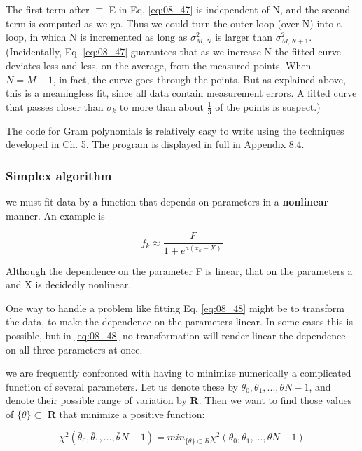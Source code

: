The first term after $\equiv$ E in Eq. \ref{eq:08_47} is independent of N, and the second term is computed as we go. Thus we could turn the outer loop (over N) into a  loop, in which N is incremented as long as $\sigma_{M,N}^{2}$ is larger than $\sigma_{M,N+1}^{2}$. (Incidentally, Eq. \ref{eq:08_47} guarantees that as we increase N the fitted curve deviates less and less, on the average, from the measured points. When $N = M-1$, in fact, the curve goes through the points. But as explained above, this is a meaningless fit, since all data contain measurement errors. A fitted curve that passes closer than $\sigma_{k}$ to more than about $\frac{1}{3}$ of the points is suspect.)

The code for Gram polynomials is relatively easy to write using the techniques developed in Ch. 5. The program is displayed in full in Appendix 8.4.

\subsubsection{Simplex algorithm}
 we must fit data by a function that depends on parameters in a \textbf{nonlinear} manner. An example is

\begin{equation}\label{eq:08_48}
f_{k} \approx \frac{F}{1+e^{a(x_{k}-X)}}
\end{equation}

Although the dependence on the parameter F is linear, that on the parameters a and X is decidedly nonlinear.

One way to handle a problem like fitting Eq. \ref{eq:08_48} might be to transform the data, to make the dependence on the parameters linear. In some cases this is possible, but in \ref{eq:08_48} no transformation will render linear the dependence on all three parameters at once.

 we are frequently confronted with having to minimize numerically a complicated function of several parameters. Let us denote these by $\theta_{0}, \theta_{1}, ... , \theta{N-1}$, and denote their possible range of variation by \textbf{R}. Then we want to find those values of $\{ \theta \} \subset$ \textbf{R} that minimize a positive function:

\begin{equation}
\chi^{2} (\bar{\theta}_{0}, \bar{\theta}_{1}, ... , \bar{\theta}{N-1}) = min_{\{ \theta \} \subset R} \chi^{2} (\theta_{0}, \theta_{1}, ... , \theta{N-1})
\end{equation}

